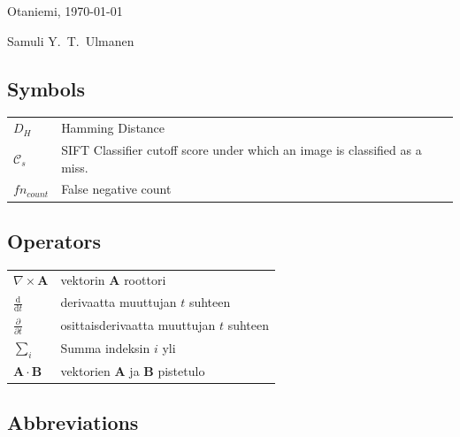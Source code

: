 \documentclass[english,12pt,a4paper,pdftex,elec,utf8]{aaltothesis}
\begin{document}
\vspace{5cm}
Otaniemi, \today

\vspace{5mm}
{\hfill Samuli Y.\ T.\ Ulmanen \hspace{1cm}}

\newpage


\thesistableofcontents


\subsection*{Symbols}

\begin{tabular}{ll}
$D_H$ & Hamming Distance\\
$\mathcal{C}_s$ & SIFT Classifier cutoff score under which an image is classified as a miss.\\
$fn_{count}$ & False negative count\\
\end{tabular}

\subsection*{Operators}

\begin{tabular}{ll}
$\nabla \times \mathbf{A}$              & vektorin $\mathbf{A}$ roottori\\
$\displaystyle\frac{\mbox{d}}{\mbox{d} t}$ & derivaatta muuttujan $t$ suhteen\\
[3mm]
$\displaystyle\frac{\partial}{\partial t}$  & osittaisderivaatta muuttujan $t$ suhteen \\[3mm]
$\sum_i $                       & Summa indeksin $i$ yli\\
$\mathbf{A} \cdot \mathbf{B}$    & vektorien $\mathbf{A}$ ja $\mathbf{B}$ pistetulo
\end{tabular}

\subsection*{Abbreviations}
\end{document}
